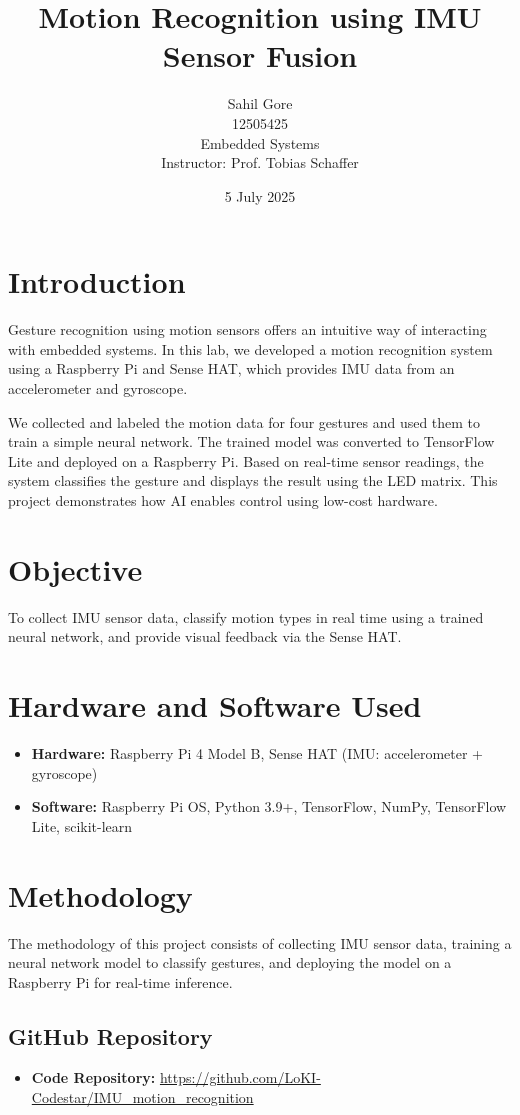 \documentclass[a4paper,12pt]{article}
\title{ \textbf{Motion Recognition using IMU Sensor Fusion}}
\author{Sahil Gore \\ 12505425  \\ Embedded Systems \\ Instructor: Prof. Tobias Schaffer}
\date{5 July 2025}
\begin{document}
\maketitle

\section{Introduction}
Gesture recognition using motion sensors offers an intuitive way of interacting with embedded systems. In this lab, we developed a motion recognition system using a Raspberry Pi and Sense HAT, which provides IMU data from an accelerometer and gyroscope.

We collected and labeled the motion data for four gestures and used them to train a simple neural network. The trained model was converted to TensorFlow Lite and deployed on a Raspberry Pi. Based on real-time sensor readings, the system classifies the gesture and displays the result using the LED matrix. This project demonstrates how AI enables control using low-cost hardware.

\section{Objective}
To collect IMU sensor data, classify motion types in real time using a trained neural network, and provide visual feedback via the Sense HAT.

\section{Hardware and Software Used}
\begin{itemize}
    \item \textbf{Hardware:} Raspberry Pi 4 Model B, Sense HAT (IMU: accelerometer + gyroscope)
    \item \textbf{Software:} Raspberry Pi OS, Python 3.9+, TensorFlow, NumPy, TensorFlow Lite, scikit-learn
\end{itemize}

\section{Methodology}
The methodology of this project consists of collecting IMU sensor data, training a neural network model to classify gestures, and deploying the model on a Raspberry Pi for real-time inference. 

\subsection*{GitHub Repository}
\begin{itemize}
    \item \textbf{Code Repository:} \url{https://github.com/LoKI-Codestar/IMU_motion_recognition}
\end{itemize}
\end{document}
